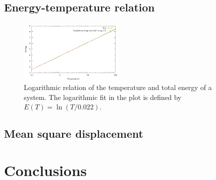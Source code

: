 \documentclass[twocolumn]{revtex4}
\begin{document}
\subsection{Energy-temperature relation}


\begin{figure}[htb]
\begin{center}
\leavevmode
\includegraphics[width=0.45\textwidth]{temp-response.png}
\end{center}
\caption{Logarithmic relation of the temperature and total energy of a system. The logarithmic fit in the plot is defined by $E(T) = \ln(T/0.022)$.}
\label{fig:temp-response}
\end{figure}

\subsection{Mean square displacement}

\section{Conclusions}
\end{document}

